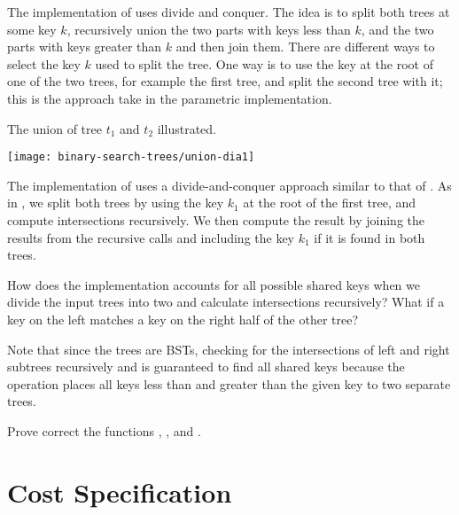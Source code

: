 The implementation of  uses divide and conquer.  The idea is
to split both trees at some key $k$, recursively union the two parts
with keys less than $k$, and the two parts with keys greater than $k$
and then join them.  
%
There are different ways to select the key $k$ used to split the tree.
%
One way is to use the key at the root of one of the two trees, for
example the first tree, and split the second tree with it; this is the
approach take in the parametric implementation.



\begin{example}
The union of tree $t_1$ and $t_2$ illustrated.

\begin{center}
  \texttt{[image: binary-search-trees/union-dia1]}
\end{center}
\label{example:tree-union}
\end{example}


The implementation of  uses a divide-and-conquer
approach similar to that  of .  
%
As in , we split both trees by using the key $k_1$ at the
root of the first tree, and compute intersections recursively.
%
We then compute the result by joining the results from the recursive
calls and including the key $k_1$ if it is found in both trees.
%
\begin{question}
How does the implementation accounts for all possible shared keys when
we divide the input trees into two and calculate intersections
recursively?  What if a key on the left matches a key on the right
half of the other tree?
\end{question}
%
Note that since the trees are BSTs, checking for the intersections of
left and right subtrees recursively and is guaranteed to find all
shared keys because the  operation places all keys less
than and greater than the given key to two separate trees.

\begin{exercise}
  Prove correct the functions , , and
  .
\end{exercise}

\section{Cost Specification}
\label{sec:bst::cost}

